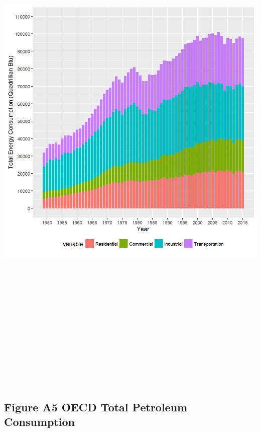 \documentclass[]{article}
\begin{document}
\includegraphics[height=10.41667in]{images/EIAdata_us_totalenrg_cons.png}

\newpage

\subsection{Figure A5 OECD Total Petroleum
Consumption}\label{figure-a5-oecd-total-petroleum-consumption}
\end{document}
